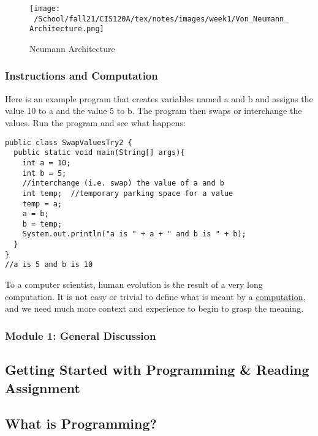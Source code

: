 \documentclass{article}
\begin{document}
\begin{figure}[h]
\centering
\texttt{[image: ~/School/fall21/CIS120A/tex/notes/images/week1/Von\_Neumann\_Architecture.png]}
\caption{Neumann Architecture\label{Neumann.png}}
\end{figure}

\subsubsection{Instructions and Computation}
Here is an example program that creates variables named a and b and assigns the value 10 to a and the value 5 to b.  The program then swaps or interchange the values.  Run the program and see what happens:
\begin{lstlisting}
public class SwapValuesTry2 {
  public static void main(String[] args){
    int a = 10;
    int b = 5;
    //interchange (i.e. swap) the value of a and b
    int temp;  //temporary parking space for a value
    temp = a;
    a = b;
    b = temp;
    System.out.println("a is " + a + " and b is " + b);
  }
}
//a is 5 and b is 10
\end{lstlisting}

To a computer scientist, human evolution is the result of a very long computation.
It is not easy or trivial to define what is meant by a \href{https://en.wikipedia.org/wiki/Computation}{computation}, and we need much more context and experience to begin to grasp the meaning.

\subsubsection{Module 1: General Discussion}

\subsection{Getting Started with Programming \& Reading Assignment}

\subsection{What is Programming?}
\end{document}

